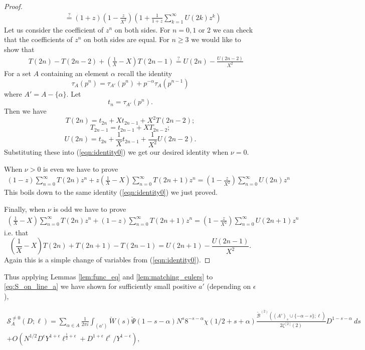 \documentclass[12pt]{amsart}
\begin{document}
\begin{proof}
\begin{eqnarray*}
			&&\qquad \stackrel{?}{=} (1+z)\left(1-\frac z {X^2}\right)\left(1+\frac{1}{1+z}\sum_{k=1}^\infty U(2k) z^k\right)
		\end{eqnarray*}
		Let us consider the coefficient of $z^n$ on both sides. For $n=0, 1$ or 2 we can check that the coefficients of $z^n$ on both sides are equal. For $n\ge 3$ we would like to show that
		\begin{eqnarray}   \label{eqn:identity0}
			&&  T(2n)  -T(2n-2) +\left(\frac 1X-X\right) T(2n-1)   \stackrel{?}{=}     
			U(2n) - \frac {U(2n-2)}{X^2}  
		\end{eqnarray}
		For a set $A$ containing an element $\alpha$ recall the identity
		$$\tau_A(p^n)=\tau_{A'}(p^n)+p^{-\alpha}\tau_A(p^{n-1})$$
		where $A'=A-\{\alpha\}$.   
		Let $$t_n=\tau_{A'}(p^n).$$
		Then we have 
		$$T(2n)=t_{2n}+X t_{2n-1}+X^2 T(2n-2);$$
		$$T_{2n-1}=t_{2n-1}+XT_{2n-2};$$
		$$U(2n)=t_{2n}+\frac 1 X t_{2n-1} +\frac{1}{X^2} U(2n-2).$$
		Substituting these into (\ref{eqn:identity0}) we get our desired  identity when $\nu=0$.
		
		When $\nu>0$ is even we have to prove 
		\begin{eqnarray*} (1-z) 
			\sum_{n=0}^\infty 
			T(2n)z^n  + z \left(\frac 1 X -X\right)\sum_{n=0}^\infty  T(2n+1)z^n 
			=\left(1-\frac{z}{X^2}\right)\sum_{n=0}^\infty U(2n)z^n
		\end{eqnarray*}
		This boils down to the same identity (\ref{eqn:identity0}) we just proved.
		
		Finally, when $\nu$ is odd we have to prove
		\begin{eqnarray*} \left(\frac 1 X-X\right)  
			\sum_{n=0}^\infty   T(2n)z^n  +(1-z) \sum_{n=0}^\infty 
			T(2n+1) z^n = \left(1-\frac{z}{X^2}\right)\sum_{n=0}^\infty U(2n+1) z^n
		\end{eqnarray*}
		i.e. that
		$$\left(\frac 1X-X\right) T(2n)+T(2n+1)-T(2n-1) =U(2n+1)-\frac{U(2n-1)}{X^2}.$$
		Again this is a simple change of variables from (\ref{eqn:identity0}).
	\end{proof}
	
	Thus applying Lemmas \ref{lem:func_eq} and \ref{lem:matching_eulers} to \eqref{eq:S_on_line_a} we have shown for sufficiently small positive $a'$ (depending on $\epsilon$),
	
	\begin{multline}
		\label{eq:S_on_line_a with Btilde}
		\mathcal S_A^{\ne 0}(D;\ell) = \sum_{\alpha\in A}  \frac 1{2\pi i} \int_{(a')}    \breve{W}(s)\breve{\Psi}(1-s-\alpha) N^s  8^{-s-\alpha} \chi(1/2+s+\alpha) \frac{\tilde{\mathcal{B}}^{(2)}((A')_s \cup \{-\alpha-s\};\ell)}{2\zeta^{[2]}(2)} D^{1-s-\alpha} ~ds\\ +O(N^{1/2}D^{\epsilon}Y^{1+\epsilon}\ell^{\frac 12+\epsilon} + D^{1+\epsilon} \ell^\epsilon /Y^{1-\epsilon}),
	\end{multline}
	
\end{document}
